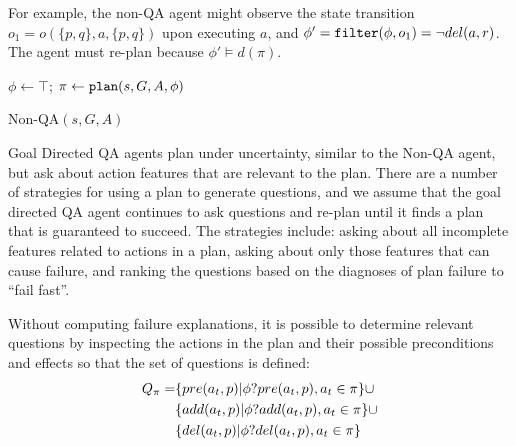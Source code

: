 \documentclass{article}
\begin{document}
For example, the non-QA agent might observe the state transition $o_1
= o(\{p,q\}, a, \{p,q\})$ upon executing $a$, and $\phi' = {\tt filter}(\phi,
o_1) = \neg del(a, r)$.  The agent must re-plan because $\phi' \models d(\pi)$.


\begin{algorithm}[t]
\SetLine
{}

 $\phi \leftarrow \top$; $\pi \leftarrow {\tt plan}(s, G, {A}, \phi)$\;
\While{$\pi \not= ()$ and $G\not\subseteq s$}{
 $a \leftarrow \pi.first()$; $\pi \leftarrow \pi.rest()$\;
\eIf{${pre}(a) \subseteq s$ and
$\phi \not\models d(\pi)$
}{
$s ' \leftarrow Execute(a)$\; $\phi \leftarrow {\tt filter}(\phi, o(s, a,
s'))$\; $s \leftarrow s'$\; } { $\phi \leftarrow \phi \wedge fail$\; }

\If{$\phi \models fail$ }{
	 $\phi \leftarrow \exists_{fail}  \phi$\;
	 $\pi \leftarrow {\tt plan}(s, G, {A}, \phi)$\;
}
}
\caption{Non-QA$(s, G, {A})$}\label{alg:replan}
\end{algorithm}


Goal Directed QA agents plan under uncertainty, similar to
the Non-QA agent, but ask about action features that are relevant to the plan.
There are a number of strategies for using a plan to generate questions, and we assume
that the goal directed QA agent continues to ask questions and re-plan until it
finds a plan that is guaranteed to succeed. The strategies include: asking about
all incomplete features related to actions in a plan, asking about only those
features that can cause failure, and ranking the questions based on the
diagnoses of plan failure to ``fail fast''.

 Without computing failure explanations, it is
possible to determine relevant questions by inspecting the actions in the plan
and their possible preconditions and effects so that the set of questions is
defined:
\begin{align}
Q_{\pi} =&  \{pre(a_t, p) | \phi?pre(a_t, p), a_t \in \pi\}
\cup\notag\\ &\{add(a_t, p)| \phi?add(a_t, p), a_t \in \pi\} \cup\notag\\ 
&\{del(a_t,p)|\phi?del(a_t, p), a_t \in \pi\}\notag
\end{align}
\end{document}
